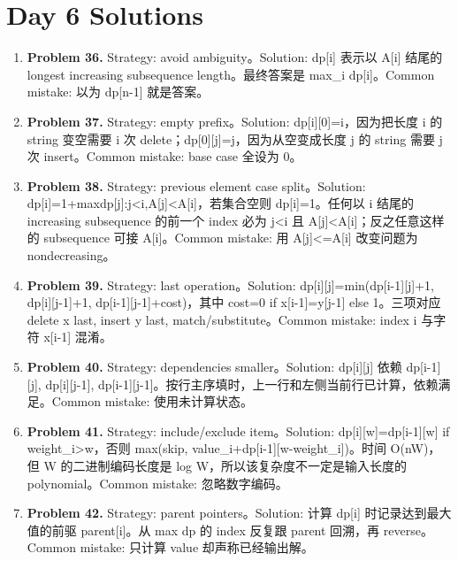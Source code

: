 \documentclass[11pt]{ctexart}
\begin{document}
\section{Day 6 Solutions}
\begin{enumerate}
  \item \textbf{Problem 36.} Strategy: avoid ambiguity。Solution: dp[i] 表示以 A[i] 结尾的 longest increasing subsequence length。最终答案是 max\_i dp[i]。Common mistake: 以为 dp[n-1] 就是答案。
  \item \textbf{Problem 37.} Strategy: empty prefix。Solution: dp[i][0]=i，因为把长度 i 的 string 变空需要 i 次 delete；dp[0][j]=j，因为从空变成长度 j 的 string 需要 j 次 insert。Common mistake: base case 全设为 0。
  \item \textbf{Problem 38.} Strategy: previous element case split。Solution: dp[i]=1+max{dp[j]:j<i,A[j]<A[i]}，若集合空则 dp[i]=1。任何以 i 结尾的 increasing subsequence 的前一个 index 必为 j<i 且 A[j]<A[i]；反之任意这样的 subsequence 可接 A[i]。Common mistake: 用 A[j]<=A[i] 改变问题为 nondecreasing。
  \item \textbf{Problem 39.} Strategy: last operation。Solution: dp[i][j]=min(dp[i-1][j]+1, dp[i][j-1]+1, dp[i-1][j-1]+cost)，其中 cost=0 if x[i-1]=y[j-1] else 1。三项对应 delete x last, insert y last, match/substitute。Common mistake: index i 与字符 x[i-1] 混淆。
  \item \textbf{Problem 40.} Strategy: dependencies smaller。Solution: dp[i][j] 依赖 dp[i-1][j], dp[i][j-1], dp[i-1][j-1]。按行主序填时，上一行和左侧当前行已计算，依赖满足。Common mistake: 使用未计算状态。
  \item \textbf{Problem 41.} Strategy: include/exclude item。Solution: dp[i][w]=dp[i-1][w] if weight\_i>w，否则 max(skip, value\_i+dp[i-1][w-weight\_i])。时间 O(nW)，但 W 的二进制编码长度是 log W，所以该复杂度不一定是输入长度的 polynomial。Common mistake: 忽略数字编码。
  \item \textbf{Problem 42.} Strategy: parent pointers。Solution: 计算 dp[i] 时记录达到最大值的前驱 parent[i]。从 max dp 的 index 反复跟 parent 回溯，再 reverse。Common mistake: 只计算 value 却声称已经输出解。
\end{enumerate}
\end{document}
